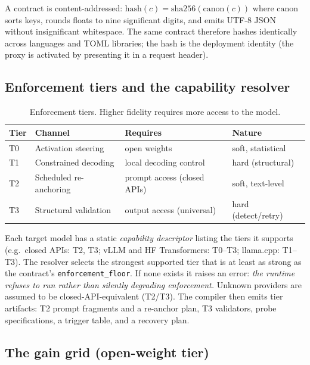\documentclass[11pt]{article}
\newcommand{\code}[1]{\texttt{#1}}
\begin{document}
A contract is content-addressed: $\text{hash}(c)=\mathrm{sha256}(\mathrm{canon}(c))$
where $\mathrm{canon}$ sorts keys, rounds floats to nine significant digits, and
emits UTF-8 JSON without insignificant whitespace. The same contract therefore
hashes identically across languages and TOML libraries; the hash is the
deployment identity (the proxy is activated by presenting it in a request
header).

\subsection{Enforcement tiers and the capability resolver}
\label{sec:compiler}

\begin{table}[t]
\centering
\caption{Enforcement tiers. Higher fidelity requires more access to the model.}
\label{tab:tiers}
\begin{tabular}{@{}llll@{}}
\toprule
Tier & Channel & Requires & Nature \\
\midrule
T0 & Activation steering & open weights & soft, statistical \\
T1 & Constrained decoding & local decoding control & hard (structural) \\
T2 & Scheduled re-anchoring & prompt access (closed APIs) & soft, text-level \\
T3 & Structural validation & output access (universal) & hard (detect/retry) \\
\bottomrule
\end{tabular}
\end{table}

Each target model has a static \emph{capability descriptor} listing the tiers it
supports (e.g.\ closed APIs: T2, T3; vLLM and HF Transformers: T0--T3; llama.cpp:
T1--T3). The resolver selects the strongest supported tier that is at least as
strong as the contract's \code{enforcement\_floor}. If none exists it raises an
error: \emph{the runtime refuses to run rather than silently degrading
enforcement.} Unknown providers are assumed to be closed-API-equivalent (T2/T3).
The compiler then emits tier artifacts: T2 prompt fragments and a re-anchor plan,
T3 validators, probe specifications, a trigger table, and a recovery plan.

\subsection{The gain grid (open-weight tier)}
\label{sec:grid}
\end{document}
